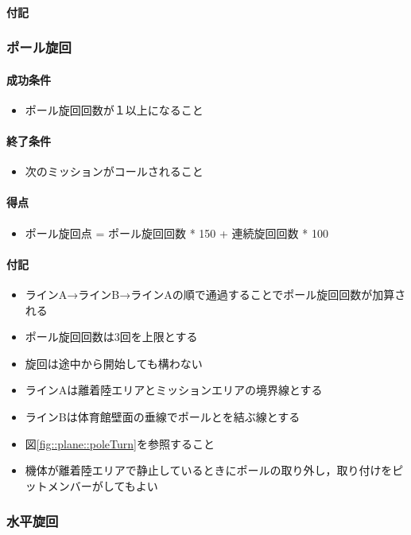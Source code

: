 \paragraph{付記}

\subsubsection{ポール旋回}
\paragraph{成功条件}
\begin{itemize}
\item ポール旋回回数が１以上になること
\end{itemize}
\paragraph{終了条件}
\begin{itemize}
\item 次のミッションがコールされること
\end{itemize}
\paragraph{得点}
\begin{itemize}
\item ポール旋回点 = ポール旋回回数 * 150 + 連続旋回回数 * 100
\end{itemize}
\paragraph{付記}
\begin{itemize}
\item ラインA→ラインB→ラインAの順で通過することでポール旋回回数が加算される
\item ポール旋回回数は3回を上限とする
\item 旋回は途中から開始しても構わない
\item ラインAは離着陸エリアとミッションエリアの境界線とする
\item ラインBは体育館壁面の垂線でポールとを結ぶ線とする
  \item 図\ref{fig::plane::poleTurn}を参照すること
\item 機体が離着陸エリアで静止しているときにポールの取り外し，取り付けをピットメンバーがしてもよい
\end{itemize}

\subsubsection{水平旋回}
